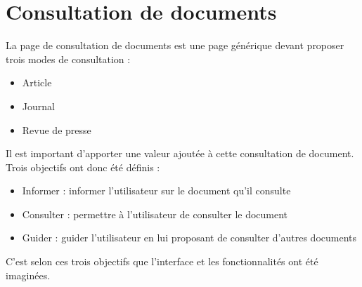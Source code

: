 \section{Consultation de documents}
\label{sec:consultation}

La page de consultation de documents est une page générique devant proposer trois modes de consultation :
\begin{itemize}
\item Article
\item Journal
\item Revue de presse
\end{itemize}

Il est important d’apporter une valeur ajoutée à cette consultation de document. Trois objectifs ont donc été définis :
\begin{itemize}
\item Informer : informer l’utilisateur sur le document qu’il consulte
\item Consulter : permettre à l’utilisateur de consulter le document
\item Guider : guider l’utilisateur en lui proposant de consulter d’autres documents
\end{itemize}
C’est selon ces trois objectifs que l’interface et les fonctionnalités ont été imaginées.



